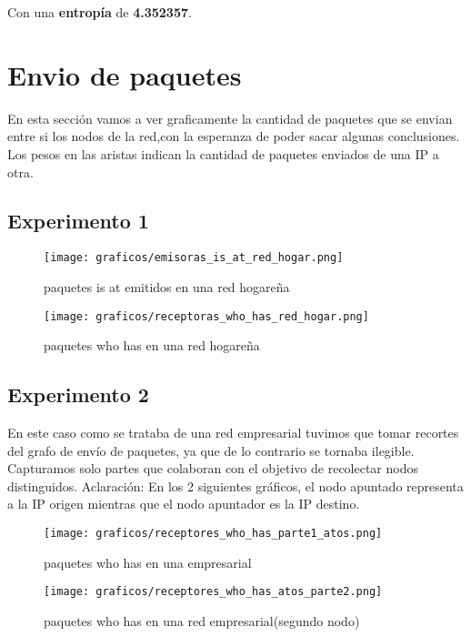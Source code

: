Con una \textbf{entropía} de \textbf{4.352357}.

\section{Envio de paquetes}
En esta sección vamos a ver graficamente la cantidad de paquetes que se envian entre si los nodos de la red,con la esperanza de poder 
sacar algunas conclusiones. Los pesos en las aristas indican la cantidad de paquetes enviados de una IP a otra.

\subsection{Experimento 1}


\begin{figure}[H]
	\centering
	\texttt{[image: graficos/emisoras\_is\_at\_red\_hogar.png]}
	\caption{paquetes is at emitidos en una red hogareña}
      \label{emisorasisat}
\end{figure}




\begin{figure}[H]
	\centering
	\texttt{[image: graficos/receptoras\_who\_has\_red\_hogar.png]}
	\caption{paquetes who has en una red hogareña}
	\label{emisoraswhohas}	
\end{figure}

\newpage


\subsection{Experimento 2}
En este caso como se trataba de una red empresarial tuvimos que tomar recortes del grafo de envío de paquetes, ya que de lo contrario
se tornaba ilegible. Capturamos solo partes que colaboran con el objetivo de recolectar nodos distinguidos. 
Aclaración: En los 2 siguientes gráficos, el nodo apuntado representa a la IP origen mientras que el nodo apuntador es la IP destino.


\begin{figure}[H]
	\centering
	\texttt{[image: graficos/receptores\_who\_has\_parte1\_atos.png]}
	\caption{paquetes who has en una empresarial}
	\label{receptoraswhohasatos}	
\end{figure}


\begin{figure}[H]
	\centering
	\texttt{[image: graficos/receptores\_who\_has\_atos\_parte2.png]}
	\caption{paquetes who has en una red empresarial(segundo nodo)}
	\label{receptoraswhohasatos2 }	
\end{figure}

